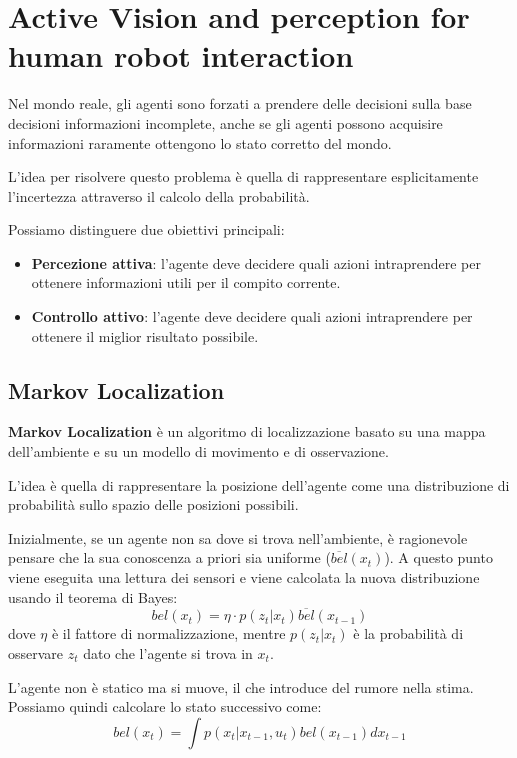\chapter{Active Vision and perception for human robot interaction}
Nel mondo reale, gli agenti sono forzati a prendere delle decisioni sulla base
decisioni informazioni incomplete, anche se gli agenti possono acquisire
informazioni raramente ottengono lo stato corretto del mondo.

L'idea per risolvere questo problema è quella di rappresentare esplicitamente
l'incertezza attraverso il calcolo della probabilità.

Possiamo distinguere due obiettivi principali:
\begin{itemize}
    \item \textbf{Percezione attiva}: l'agente deve decidere quali azioni
          intraprendere per ottenere informazioni utili per il compito corrente.
    \item \textbf{Controllo attivo}: l'agente deve decidere quali azioni
          intraprendere per ottenere il miglior risultato possibile.
\end{itemize}
\section{Markov Localization}
\textbf{Markov Localization} è un algoritmo di localizzazione basato su una mappa
dell'ambiente e su un modello di movimento e di osservazione.

L'idea è quella di rappresentare la posizione dell'agente come una distribuzione
di probabilità sullo spazio delle posizioni possibili.

Inizialmente, se un agente non sa dove si trova nell'ambiente, è ragionevole
pensare che la sua conoscenza a priori sia uniforme ($\overline{bel}(x_t)$).
A questo punto viene eseguita una lettura dei sensori e viene calcolata la
nuova distribuzione usando il teorema di Bayes:
\begin{equation}
    bel(x_t) = \eta \cdot p(z_t|x_t) \overline{bel}(x_{t-1})
\end{equation}
dove $\eta$ è il fattore di normalizzazione, mentre $p(z_t|x_t)$ è la probabilità
di osservare $z_t$ dato che l'agente si trova in $x_t$.

L'agente non è statico ma si muove, il che introduce del rumore nella stima.
Possiamo quindi calcolare lo stato successivo come:
\begin{equation}
    bel(x_t) = \int p(x_t|x_{t-1},u_t) bel(x_{t-1}) dx_{t-1}
\end{equation}

